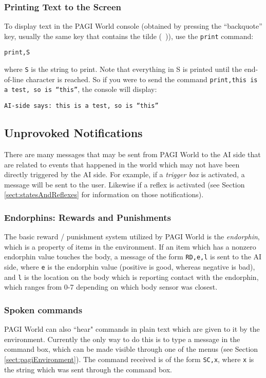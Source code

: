 \subsubsection{Printing Text to the Screen}

To display text in the PAGI World console (obtained by pressing the ``backquote'' key, usually the same key that contains the tilde (~)), use the \texttt{print} command:

\texttt{print,S}

\noindent where \texttt{S} is the string to print. Note that everything in S is printed until the end-of-line character is reached. So if you were to send the command \texttt{print,this is a test, so is ``this''}, the console will display:

\texttt{AI-side says: this is a test, so is ``this''}

\subsection{Unprovoked Notifications}

There are many messages that may be sent from PAGI World to the AI side that are related to events that happened in the world which may not have been directly triggered by the AI side. For example, if a \textit{trigger box} is activated, a message will be sent to the user. Likewise if a reflex is activated (see Section \ref{sect:statesAndReflexes} for information on those notifications).

\subsubsection{Endorphins: Rewards and Punishments}

The basic reward / punishment system utilized by PAGI World is the \textit{endorphin}, which is a property of items in the environment. If an item which has a nonzero endorphin value touches the body, a message of the form \texttt{RD,e,l} is sent to the AI side, where \texttt{e} is the endorphin value (positive is good, whereas negative is bad), and \texttt{l} is the location on the body which is reporting contact with the endorphin, which ranges from 0-7 depending on which body sensor was closest.

\subsubsection{Spoken commands}

PAGI World can also ``hear" commands in plain text which are given to it by the environment. Currently the only way to do this is to type a message in the command box, which can be made visible through one of the menus (see Section \ref{sect:pagiEnvironment}). The command received is of the form \texttt{SC,x}, where \texttt{x} is the string which was sent through the command box.

